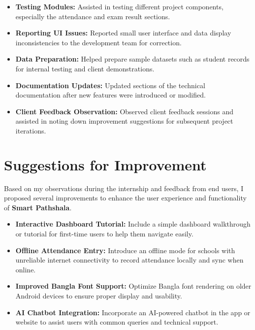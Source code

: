 \documentclass[12pt,a4paper]{report}
\newcommand{\project}[1]{\textcolor{projectcolor}{\textbf{#1}}}
\newenvironment{coloritemize}
{\begin{itemize}[label=\textcolor{primaryblue}{$\bullet$}]}
{\end{itemize}}
\begin{document}
\begin{coloritemize}
    \item \textcolor{secondaryblue}{\textbf{Testing Modules:}} Assisted in testing different project components, especially the attendance and exam result sections.
    \item \textcolor{secondaryblue}{\textbf{Reporting UI Issues:}} Reported small user interface and data display inconsistencies to the development team for correction.
    \item \textcolor{secondaryblue}{\textbf{Data Preparation:}} Helped prepare sample datasets such as student records for internal testing and client demonstrations.
    \item \textcolor{secondaryblue}{\textbf{Documentation Updates:}} Updated sections of the technical documentation after new features were introduced or modified.
    \item \textcolor{secondaryblue}{\textbf{Client Feedback Observation:}} Observed client feedback sessions and assisted in noting down improvement suggestions for subsequent project iterations.
\end{coloritemize}

\section{Suggestions for Improvement}
Based on my observations during the internship and feedback from end users, I proposed several improvements to enhance the user experience and functionality of \project{Smart Pathshala}.

\begin{coloritemize}
    \item \textcolor{secondaryblue}{\textbf{Interactive Dashboard Tutorial:}} Include a simple dashboard walkthrough or tutorial for first-time users to help them navigate easily.
    \newpage
    \item \textcolor{secondaryblue}{\textbf{Offline Attendance Entry:}} Introduce an offline mode for schools with unreliable internet connectivity to record attendance locally and sync when online.
    \item \textcolor{secondaryblue}{\textbf{Improved Bangla Font Support:}} Optimize Bangla font rendering on older Android devices to ensure proper display and usability.
    \item \textcolor{secondaryblue}{\textbf{AI Chatbot Integration:}} Incorporate an AI-powered chatbot in the app or website to assist users with common queries and technical support.
\end{coloritemize}
\end{document}

